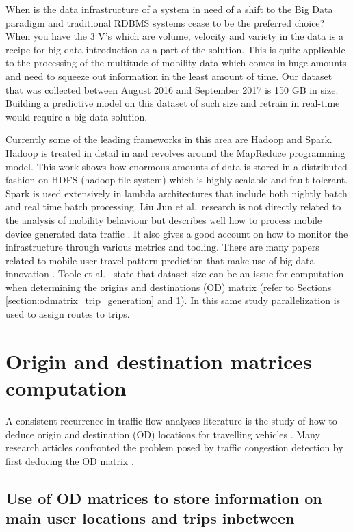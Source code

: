 \documentclass[12pt, a4paper]{report}
\theoremstyle{definition}
\theoremstyle{definition}%
\theoremstyle{definition}%
\theoremstyle{definition}%
\theoremstyle{definition}%
\theoremstyle{definition}%
\begin{document}
When is the data infrastructure of a system in need of a shift to the Big Data paradigm and traditional RDBMS systems cease to be the preferred choice? When you have the 3 V's which are volume, velocity and variety in the data is a recipe for big data introduction as a part of the solution. This is quite applicable to the processing of the multitude of mobility data which comes in huge amounts and need to squeeze out information in the least amount of time. Our dataset that was collected between August 2016 and September 2017 is 150 GB in size. Building a predictive model on this dataset of such size and retrain in real-time would require a big data solution. 

Currently some of the leading frameworks in this area are Hadoop and Spark. Hadoop is treated in detail in \cite{Liu2014} and revolves around the MapReduce programming model. This work shows how enormous amounts of data is stored in a distributed fashion on HDFS (hadoop file system) which is highly scalable and fault tolerant. Spark is used extensively in lambda architectures that include both nightly batch and real time batch processing. Liu Jun et al.\ research is not directly related to the analysis of mobility behaviour but describes well how to process mobile device generated data traffic \cite{Liu2014}. It also gives a good account on how to monitor the infrastructure through various metrics and tooling. There are many papers related to mobile user travel pattern prediction that make use of big data innovation  \cite{Liu2014,Laurila2012,Kurien2012}. Toole et al.\ \cite{Toole2015} state that dataset size can be an issue for computation when determining the origins and destinations (OD) matrix (refer to Sections \ref{section:odmatrix_trip_generation} and \ref{section:OD_Matrices}). In this same study parallelization is used to assign routes to trips.


\section{Origin and destination matrices computation} \label{section:OD_Matrices}
A consistent recurrence in traffic flow analyses literature is the study of how to deduce origin and destination (OD) locations for travelling vehicles \cite{Iqbal2014}. Many research articles confronted the problem posed by traffic congestion detection by first deducing the OD matrix \cite{Toole2015,Iqbal2014,Alexander2015,Calabrese2011,Calabrese2013,Colak2015}. 

\subsection{Use of OD matrices to store information on main user locations and trips inbetween}
\end{document}
